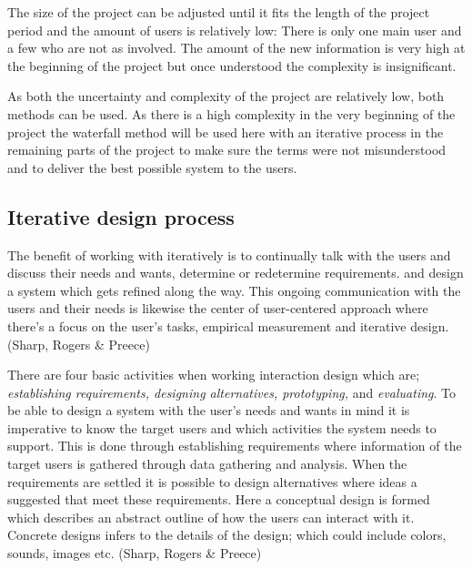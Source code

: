 The size of the project can be adjusted until it fits the length of the project period and the amount of users is relatively low: There is only one main user and a few who are not as involved. The amount of the new information is very high at the beginning of the project but once understood the complexity is insignificant.

As both the uncertainty and complexity of the project are relatively low, both methods can be used. As there is a high complexity in the very beginning of the project the waterfall method will be used here with an iterative process in the remaining parts of the project to make sure the terms were not misunderstood and to deliver the best possible system to the users. %



\subsection{Iterative design process}
The benefit of working with iteratively is to continually talk with the users and discuss their needs and wants, determine or redetermine requirements. and design a system which gets refined along the way. This ongoing communication with the users and their needs is likewise the center of user-centered approach where there’s a focus on the user’s tasks, empirical measurement and iterative design. (Sharp, Rogers \& Preece)

There are four basic activities when working interaction design which are; \textit{establishing requirements, designing alternatives, prototyping,} and \textit{evaluating}. To be able to design a system with the user’s needs and wants in mind it is imperative to know the target users and which activities the system needs to support. This is done through establishing requirements where information of the target users is gathered through data gathering and analysis. When the requirements are settled it is possible to design alternatives where ideas a suggested that meet these requirements. Here a conceptual design is formed which describes an abstract outline of how the users can interact with it. Concrete designs infers to the details of the design; which could include colors, sounds, images etc. (Sharp, Rogers \& Preece)

